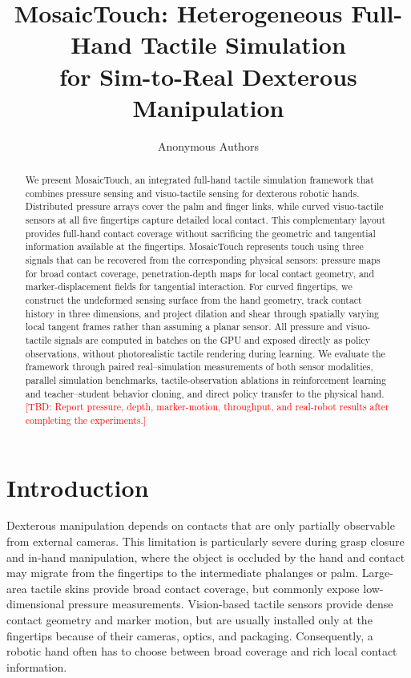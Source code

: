 \documentclass[10pt,twocolumn]{article}
\title{MosaicTouch: Heterogeneous Full-Hand Tactile Simulation\\
for Sim-to-Real Dexterous Manipulation}
\author{Anonymous Authors}
\date{}
\newcommand{\TBD}[1]{\textcolor{red}{[TBD: #1]}}
\begin{document}
\maketitle

\begin{abstract}
We present MosaicTouch, an integrated full-hand tactile simulation framework
that combines pressure sensing and visuo-tactile sensing for dexterous robotic
hands. Distributed pressure arrays cover the palm and finger links, while
curved visuo-tactile sensors at all five fingertips capture detailed local
contact. This complementary layout provides full-hand contact coverage without
sacrificing the geometric and tangential information available at the
fingertips. MosaicTouch represents touch using three signals that can be
recovered from the corresponding physical sensors: pressure maps for broad
contact coverage, penetration-depth maps for local contact geometry, and
marker-displacement fields for tangential interaction. For curved fingertips,
we construct the undeformed sensing surface from the hand geometry, track
contact history in three dimensions, and project dilation and shear through
spatially varying local tangent frames rather than assuming a planar sensor.
All pressure and visuo-tactile signals are computed in batches on the GPU and
exposed directly as policy observations, without photorealistic tactile
rendering during learning. We evaluate the framework through paired
real--simulation measurements of both sensor modalities, parallel simulation
benchmarks, tactile-observation ablations in reinforcement learning and
teacher--student behavior cloning, and direct policy transfer to the physical
hand. \TBD{Report pressure, depth, marker-motion, throughput, and real-robot
results after completing the experiments.}
\end{abstract}

\section{Introduction}
\label{sec:introduction}

Dexterous manipulation depends on contacts that are only partially observable
from external cameras.  This limitation is particularly severe during grasp
closure and in-hand manipulation, where the object is occluded by the hand and
contact may migrate from the fingertips to the intermediate phalanges or palm.
Large-area tactile skins provide broad contact coverage, but commonly expose
low-dimensional pressure measurements.  Vision-based tactile sensors provide
dense contact geometry and marker motion, but are usually installed only at the
fingertips because of their cameras, optics, and packaging.  Consequently, a
robotic hand often has to choose between broad coverage and rich local contact
information.
\end{document}
